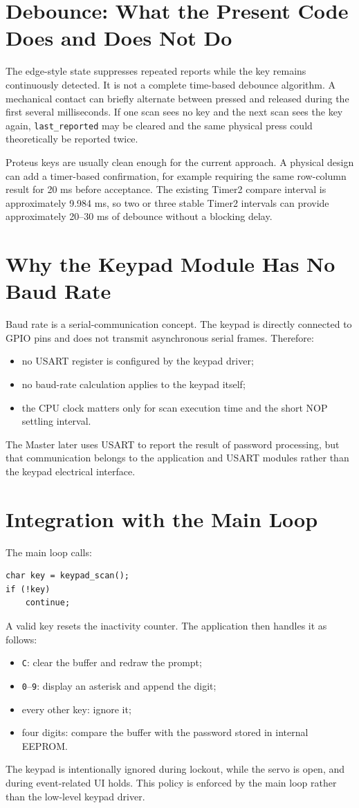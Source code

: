 \documentclass[11pt,a4paper]{article}
\begin{document}
\section{Debounce: What the Present Code Does and Does Not Do}
The edge-style state suppresses repeated reports while the key remains continuously detected. It is not a complete time-based debounce algorithm. A mechanical contact can briefly alternate between pressed and released during the first several milliseconds. If one scan sees no key and the next scan sees the key again, \texttt{last\_reported} may be cleared and the same physical press could theoretically be reported twice.

Proteus keys are usually clean enough for the current approach. A physical design can add a timer-based confirmation, for example requiring the same row-column result for 20 ms before acceptance. The existing Timer2 compare interval is approximately 9.984 ms, so two or three stable Timer2 intervals can provide approximately 20--30 ms of debounce without a blocking delay.

\section{Why the Keypad Module Has No Baud Rate}
Baud rate is a serial-communication concept. The keypad is directly connected to GPIO pins and does not transmit asynchronous serial frames. Therefore:
\begin{itemize}
  \item no USART register is configured by the keypad driver;
  \item no baud-rate calculation applies to the keypad itself;
  \item the CPU clock matters only for scan execution time and the short NOP settling interval.
\end{itemize}
The Master later uses USART to report the result of password processing, but that communication belongs to the application and USART modules rather than the keypad electrical interface.

\section{Integration with the Main Loop}
The main loop calls:
\begin{lstlisting}[style=cstyle]
char key = keypad_scan();
if (!key)
    continue;
\end{lstlisting}
A valid key resets the inactivity counter. The application then handles it as follows:
\begin{itemize}
  \item \texttt{C}: clear the buffer and redraw the prompt;
  \item \texttt{0}--\texttt{9}: display an asterisk and append the digit;
  \item every other key: ignore it;
  \item four digits: compare the buffer with the password stored in internal EEPROM.
\end{itemize}
The keypad is intentionally ignored during lockout, while the servo is open, and during event-related UI holds. This policy is enforced by the main loop rather than the low-level keypad driver.
\end{document}
